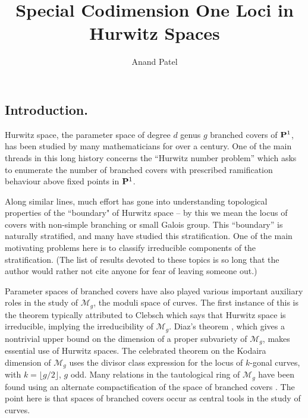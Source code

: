 \documentclass[reqno, 10 pt]{article}
\title{Special Codimension One Loci in Hurwitz Spaces}
\author{Anand Patel}
\theoremstyle{definition}
\theoremstyle{remark}
\numberwithin{equation}{section}
\numberwithin{thm}{section}
\numberwithin{prop}{section}
\numberwithin{lem}{section}
\numberwithin{cor}{section}
\numberwithin{conj}{section}
\numberwithin{defn}{section}
\newcommand{\M}{\mathcal M}
\renewcommand{\P}{{\bf P}}
\begin{document}
\maketitle
{}



\subsection{Introduction.}

Hurwitz space, the parameter space of degree $d$ genus $g$ branched covers of $\P^{1}$, has been studied by many mathematicians for over a century.  One of the main threads in this long history concerns the ``Hurwitz number problem'' which asks to enumerate the number of branched covers with prescribed ramification behaviour above fixed points in $\P^{1}$. 

Along similar lines, much effort has gone into understanding topological properties of the ``boundary" of Hurwitz space -- by this we mean the locus of covers with non-simple branching or small Galois group.  This ``boundary'' is naturally stratified, and many have studied this stratification. One of the main motivating problems here is to classify irreducible components of the stratification.  (The list of results devoted to these topics is so long that the author would rather not cite anyone for fear of leaving someone out.) 

Parameter spaces of branched covers have also played various important auxiliary roles in the study of $\M_{g}$, the moduli space of curves. The first instance of this is the theorem typically attributed to Clebsch \cite{clebsch-irreducibility} which says that Hurwitz space is irreducible, implying the irreducibility of $\M_{g}$. Diaz's theorem \cite{diaz-complete}, which gives a nontrivial upper bound on the dimension of a proper subvariety of $\M_{g}$, makes essential use of Hurwitz spaces.  The celebrated theorem on the Kodaira dimension of $\M_{g}$ \cite{Harris82:_Kodair_Dimen_Of_Modul_Space_Of_Curves} uses the divisor class expression for the locus of $k$-gonal curves, with $k = \lfloor g/2 \rfloor$, $g$ odd. Many relations in the tautological ring of $\M_{g}$ have been found using an alternate compactification of the space of branched covers \cite{pand-pix}.  The point here is that spaces of branched covers occur as central tools in the study of curves.
\end{document}
